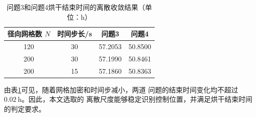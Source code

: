 \documentclass[12pt,a4paper]{article}
\begin{document}
\begin{center}
\begin{table}[H]
\centering
\caption{问题3和问题4烘干结束时间的离散收敛结果（单位：h）}
\label{tab:q34-convergence}
\begin{tabular}{cccc}
\toprule
径向网格数 $N$ & 时间步长/s & 问题3 & 问题4\\
\midrule
120 & 30 & 57.2053 & 50.8500\\
200 & 30 & 57.1990 & 50.8461\\
200 & 15 & 57.1860 & 50.8363\\
\bottomrule
\end{tabular}
\end{table}

由表\ref{tab:q34-convergence}可见，随着网格加密和时间步减小，两道
问题的结束时间变化均不超过 $0.02\ \mathrm{h}$。因此，本文选取的
离散尺度能够稳定识别控制位置，并满足烘干结束时间的判定要求。


% 
% 

% 
% 

% 
% 


\end{center}
\end{document}
